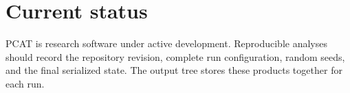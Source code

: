 \documentclass[letterpaper,10pt,english]{sphinxmanual}
\begin{document}
\chapter{Current status}
\label{\detokenize{index:current-status}}
\sphinxAtStartPar
PCAT is research software under active development. Reproducible analyses should
record the repository revision, complete run configuration, random seeds, and
the final serialized state. The output tree stores these products together for
each run.



\renewcommand{\indexname}{Index}
\printindex
\end{document}
